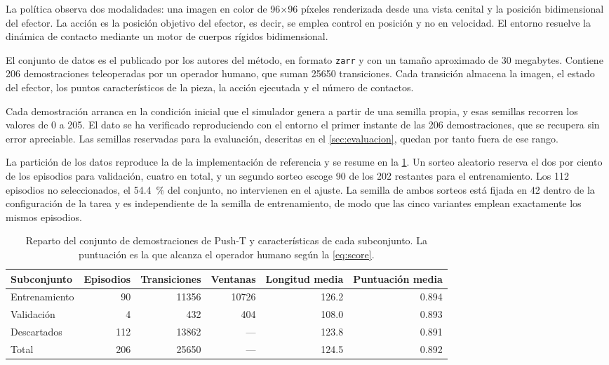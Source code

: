 La pol\'itica observa dos modalidades: una imagen en color de \num{96}$\times$\num{96}
p\'ixeles renderizada desde una vista cenital y la posici\'on bidimensional del efector. La
acci\'on es la posici\'on objetivo del efector, es decir, se emplea control en posici\'on y
no en velocidad. El entorno resuelve la din\'amica de contacto mediante un motor de
cuerpos r\'igidos bidimensional.

El conjunto de datos es el publicado por los autores del m\'etodo, en formato \texttt{zarr}
y con un tama\~no aproximado de \num{30} megabytes. Contiene \num{206} demostraciones
teleoperadas por un operador humano, que suman \num{25650} transiciones. Cada transici\'on
almacena la imagen, el estado del efector, los puntos caracter\'isticos de la pieza, la
acci\'on ejecutada y el n\'umero de contactos.

Cada demostraci\'on arranca en la condici\'on inicial que el simulador genera a partir de
una semilla propia, y esas semillas recorren los valores de \num{0} a \num{205}. El dato se
ha verificado reproduciendo con el entorno el primer instante de las \num{206}
demostraciones, que se recupera sin error apreciable. Las semillas reservadas para la
evaluaci\'on, descritas en el \cref{sec:evaluacion}, quedan por tanto fuera de ese rango.

La partici\'on de los datos reproduce la de la implementaci\'on de referencia y se resume en
la \cref{tab:particion}. Un sorteo aleatorio reserva el dos por ciento de los episodios para
validaci\'on, cuatro en total, y un segundo sorteo escoge \num{90} de los \num{202}
restantes para el entrenamiento. Los \num{112} episodios no seleccionados, el
\SI{54.4}{\percent} del conjunto, no intervienen en el ajuste. La semilla de ambos sorteos
est\'a fijada en \num{42} dentro de la configuraci\'on de la tarea y es independiente de la
semilla de entrenamiento, de modo que las cinco variantes emplean exactamente los mismos
episodios.

\begin{table}[htbp]
  \centering
  \caption{Reparto del conjunto de demostraciones de Push-T y caracter\'isticas de cada
    subconjunto. La puntuaci\'on es la que alcanza el operador humano seg\'un la
    \cref{eq:score}.}
  \label{tab:particion}
  \small
  \begin{tabular}{lrrrrr}
    \toprule
    Subconjunto & Episodios & Transiciones & Ventanas & Longitud media &
      Puntuaci\'on media \\
    \midrule
    Entrenamiento & 90  & \num{11356} & \num{10726} & \num{126.2} & \num{0.894} \\
    Validaci\'on  & 4   & \num{432}   & \num{404}   & \num{108.0} & \num{0.893} \\
    Descartados   & 112 & \num{13862} & ---         & \num{123.8} & \num{0.891} \\
    \midrule
    Total         & 206 & \num{25650} & ---         & \num{124.5} & \num{0.892} \\
    \bottomrule
  \end{tabular}
\end{table}


